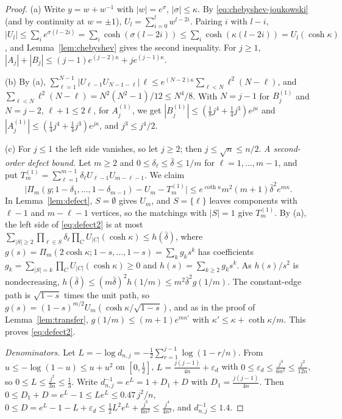 \documentclass[11pt]{amsart}
\theoremstyle{definition}
\theoremstyle{remark}
\numberwithin{equation}{section}
\newcommand{\eps}{\varepsilon}
\begin{document}
\begin{proof}
(a) Write $y=w+w^{-1}$ with $|w|=e^\sigma$, $|\sigma|\le\kappa$. By \eqref{eq:chebyshev-joukowski} (and by continuity
at $w=\pm1$), $U_l=\sum_{i=0}^lw^{l-2i}$. Pairing $i$ with $l-i$,
$|U_l|\le\sum_ie^{\sigma(l-2i)}=\sum_i\cosh(\sigma(l-2i))\le\sum_i\cosh(\kappa(l-2i))=U_l(\cosh\kappa)$, and
Lemma~\ref{lem:chebyshev} gives the second inequality. For $j\ge1$, $|A_j|+|B_j|\le(j-1)e^{(j-2)\kappa}+je^{(j-1)\kappa}$.

(b) By (a), $\sum_{\ell=1}^{N-1}|U_{\ell-1}U_{N-1-\ell}|\,\ell\le e^{(N-2)\kappa}\sum_{\ell<N}\ell^2(N-\ell)$, and
$\sum_{\ell<N}\ell^2(N-\ell)=N^2(N^2-1)/12\le N^4/8$. With $N=j-1$ for $B^{(1)}_j$ and $N=j-2$, $\ell+1\le2\ell$, for
$A^{(1)}_j$, we get $|B^{(1)}_j|\le(\frac18j^4+\frac14j^3)e^{j\kappa}$ and $|A^{(1)}_j|\le(\frac14j^4+\frac14j^3)e^{j\kappa}$,
and $j^3\le j^4/2$.

(c) For $j\le1$ the left side vanishes, so let $j\ge2$; then $j\le\sqrt n\le n/2$. \emph{A second-order defect bound.}
Let $m\ge2$ and $0\le\delta_\ell\le\bar\delta\le1/m$ for $\ell=1,\dots,m-1$, and put
$T^{(1)}_m=\sum_{\ell=1}^{m-1}\delta_\ell U_{\ell-1}U_{m-\ell-1}$. We claim
\begin{equation}\label{eq:defect2}
\bigl|\Pi_m(y;1-\delta_1,\dots,1-\delta_{m-1})-U_m-T^{(1)}_m\bigr|\le e^{\coth\kappa}m^2(m+1)\bar\delta^2e^{m\kappa}.
\end{equation}
In Lemma~\ref{lem:defect}, $S=\emptyset$ gives $U_m$, and $S=\{\ell\}$ leaves components with $\ell-1$ and $m-\ell-1$
vertices, so the matchings with $|S|=1$ give $T^{(1)}_m$. By (a), the left side of \eqref{eq:defect2} is at most
$\sum_{|S|\ge2}\prod_{\ell\in S}\delta_\ell\prod_CU_{|C|}(\cosh\kappa)\le h(\bar\delta)$, where
$g(s)=\Pi_m(2\cosh\kappa;1-s,\dots,1-s)=\sum_kg_ks^k$ has coefficients
$g_k=\sum_{|S|=k}\prod_CU_{|C|}(\cosh\kappa)\ge0$ and $h(s)=\sum_{k\ge2}g_ks^k$. As $h(s)/s^2$ is nondecreasing,
$h(\bar\delta)\le(m\bar\delta)^2h(1/m)\le m^2\bar\delta^2g(1/m)$. The constant-edge path is $\sqrt{1-s}$ times the unit
path, so $g(s)=(1-s)^{m/2}U_m(\cosh\kappa/\sqrt{1-s})$, and as in the proof of Lemma~\ref{lem:transfer},
$g(1/m)\le(m+1)e^{m\kappa'}$ with $\kappa'\le\kappa+\coth\kappa/m$. This proves \eqref{eq:defect2}.

\emph{Denominators.} Let $L=-\log d_{n,j}=-\frac12\sum_{r=1}^{j-1}\log(1-r/n)$. From $u\le-\log(1-u)\le u+u^2$ on
$[0,\frac12]$, $L=\frac{j(j-1)}{4n}+\eps_d$ with $0\le\eps_d\le\frac{j^3}{6n^2}\le\frac{j^2}{12n}$, so
$0\le L\le\frac{j^2}{3n}\le\frac13$. Write $d_{n,j}^{-1}=e^L=1+D_1+D$ with $D_1=\frac{j(j-1)}{4n}$. Then
$0\le D_1+D=e^L-1\le Le^L\le0.47\,j^2/n$, $0\le D=e^L-1-L+\eps_d\le\frac12L^2e^L+\frac{j^3}{6n^2}\le\frac{j^4}{4n^2}$, and
$d_{n,j}^{-1}\le1.4$.


\end{proof}
\end{document}
